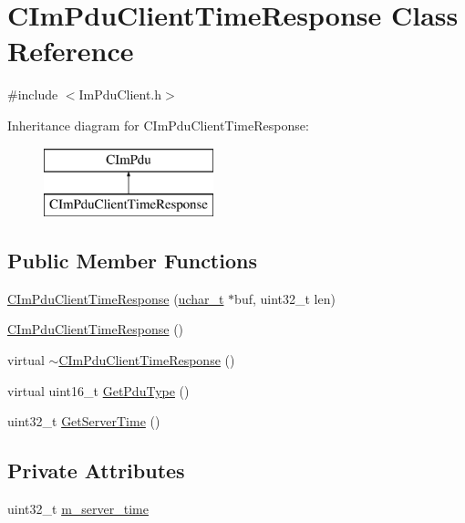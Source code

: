 \hypertarget{class_c_im_pdu_client_time_response}{}\section{C\+Im\+Pdu\+Client\+Time\+Response Class Reference}
\label{class_c_im_pdu_client_time_response}


{\ttfamily \#include $<$Im\+Pdu\+Client.\+h$>$}

Inheritance diagram for C\+Im\+Pdu\+Client\+Time\+Response\+:\begin{figure}[H]
\begin{center}
\leavevmode
\includegraphics[height=2.000000cm]{class_c_im_pdu_client_time_response}
\end{center}
\end{figure}
\subsection*{Public Member Functions}
\begin{DoxyCompactItemize}
\item 
\hyperlink{class_c_im_pdu_client_time_response_a5df92607ffb6c2227c0c58275460c697}{C\+Im\+Pdu\+Client\+Time\+Response} (\hyperlink{base_2ostype_8h_a124ea0f8f4a23a0a286b5582137f0b8d}{uchar\+\_\+t} $\ast$buf, uint32\+\_\+t len)
\item 
\hyperlink{class_c_im_pdu_client_time_response_a3c7768e0ec504cd37619c635227a5b26}{C\+Im\+Pdu\+Client\+Time\+Response} ()
\item 
virtual \hyperlink{class_c_im_pdu_client_time_response_a76d7da8f8713884b03775b56467d8711}{$\sim$\+C\+Im\+Pdu\+Client\+Time\+Response} ()
\item 
virtual uint16\+\_\+t \hyperlink{class_c_im_pdu_client_time_response_a4f0e0cfcd3e2fad8b25ddc8240376861}{Get\+Pdu\+Type} ()
\item 
uint32\+\_\+t \hyperlink{class_c_im_pdu_client_time_response_ae0eb96e6eb722fb9a0a43b1128b439b6}{Get\+Server\+Time} ()
\end{DoxyCompactItemize}
\subsection*{Private Attributes}
\begin{DoxyCompactItemize}
\item 
uint32\+\_\+t \hyperlink{class_c_im_pdu_client_time_response_a40aa936a8e0706f31f9c297a9f1e2751}{m\+\_\+server\+\_\+time}
\end{DoxyCompactItemize}
